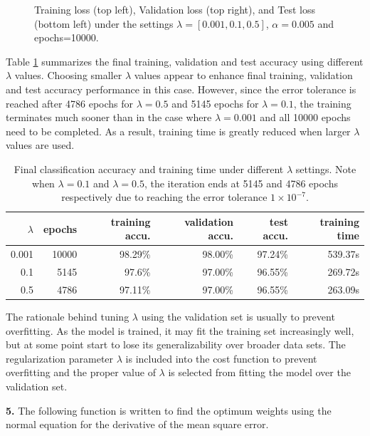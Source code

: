 \documentclass[12pt]{article}
\newenvironment{problem}[2][Problem]{\begin{trivlist}
\item[\hskip \labelsep {\bfseries #1}\hskip \labelsep {\bfseries #2.}]}{\end{trivlist}}
\begin{document}
\begin{problem}{1}
\begin{figure}[!htb]
\endminipage
\caption{Training loss (top left), Validation loss (top right), and Test loss (bottom left) under the settings  $\lambda=[0.001, 0.1, 0.5]$, $\alpha=0.005$ and epochs=10000.}\label{fig:1-4}
\end{figure}

\bigskip

Table \ref{table:1-4} summarizes the final training, validation and test accuracy using different $\lambda$ values. Choosing smaller $\lambda$ values appear to enhance final training, validation and test accuracy performance in this case. However, since the error tolerance is reached after 4786 epochs for $\lambda=0.5$ and  5145 epochs for $\lambda=0.1$, the training terminates much sooner than in the case where $\lambda=0.001$ and all 10000 epochs need to be completed. As a result, training time is greatly reduced when larger $\lambda$ values are used.


\begin{table}[!htb]
\center
\begin{tabular}{rrrrrr}
$\lambda$ & epochs & training accu. & validation accu. & test accu. & training time \\ \hline
0.001     & 10000   & 98.29\%        & 98.00\%          & 97.24\%    & 539.37s   \\
0.1       & 5145   & 97.6\%        & 97.00\%          & 96.55\%    & 269.72s   \\
0.5       & 4786   & 97.11\%        & 97.00\%          & 96.55\%    & 263.09s   \\ \hline\end{tabular}
\caption{Final classification accuracy and training time under different $\lambda$ settings. Note when $\lambda = 0.1$ and $\lambda = 0.5$, the iteration ends at 5145 and 4786 epochs respectively due to reaching the error tolerance $1\times10^{-7}$.}
\label{table:1-4}
\end{table}

\bigskip

The rationale behind tuning  $\lambda$ using the validation set is usually to prevent overfitting. As the model is trained, it may fit the training set increasingly well, but at some point start to lose its generalizability over broader data sets. The regularization parameter $\lambda$ is included into the cost function to prevent overfitting and the proper value of $\lambda$ is selected from fitting the model over the validation set.
\bigskip

\textbf{5.} The following function is written to find the optimum weights using the normal equation for the derivative of the mean square error. 


\end{problem}
\end{document}
